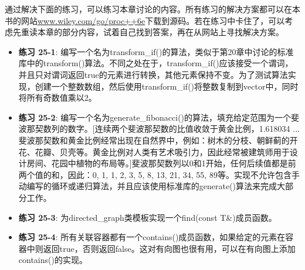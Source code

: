 通过解决下面的练习，可以练习本章讨论的内容。所有练习的解决方案都可以在本书的网站\url{www.wiley.com/go/proc++6e}下载到源码。若在练习中卡住了，可以考虑先重读本章的部分内容，试着自己找到答案，再在从网站上寻找解决方案。

\begin{itemize}
\item
\textbf{练习 25-1}: 编写一个名为transform\_if()的算法，类似于第20章中讨论的标准库中的transform()算法。不同之处在于，transform\_if()应该接受一个谓词，并且只对谓词返回true的元素进行转换，其他元素保持不变。为了测试算法实现，创建一个整数数组，然后使用transform\_if()将整数复制到vector中，同时将所有奇数值乘以2。

\item
\textbf{练习 25-2}: 编写一个名为generate\_fibonacci()的算法，填充给定范围为一个斐波那契数列的数字。[连续两个斐波那契数的比值收敛于黄金比例，1.618034 ... 斐波那契数和黄金比例经常出现在自然界中，例如：树木的分枝、朝鲜蓟的开花、花瓣、贝壳等。黄金比例对人类有艺术吸引力，因此经常被建筑师用于设计房间、花园中植物的布局等。]斐波那契数列以0和1开始，任何后续值都是前两个值的和，因此：0, 1, 1, 2, 3, 5, 8, 13, 21, 34, 55, 89等。实现不允许包含手动编写的循环或递归算法，并且应该使用标准库的generate()算法来完成大部分工作。

\item
\textbf{练习 25-3}: 为directed\_graph类模板实现一个find(const T\&)成员函数。

\item
\textbf{练习 25-4}: 所有关联容器都有一个contains()成员函数，如果给定的元素在容器中则返回true，否则返回false。这对有向图也很有用，可以在有向图上添加contains()的实现。
\end{itemize}












